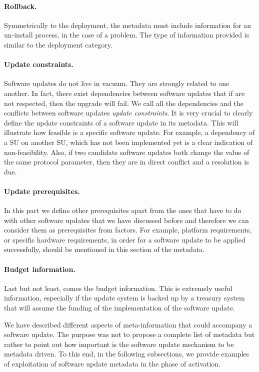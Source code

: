 \paragraph{Rollback.} Symmetrically to the deployment, the metadata must include information for an un-install process, in the case of a problem. The type of information provided is similar to the deployment category.
\paragraph{Update constraints.} Software updates do not live in vacuum. They are strongly related to one another. In fact, there exist dependencies between software updates that if are not respected, then the upgrade will fail. We call all the dependencies and the conflicts between software updates \emph{update constraints}. It is very crucial to clearly define the update constraints of a software update in its metadata. This will illustrate how feasible is a specific software update. For example, a dependency of a SU on another SU, which has not been implemented yet is a clear indication of non-feasibility. Also, if two candidate software updates both change the value of the same protocol parameter, then they are in direct conflict and a resolution is due.
\paragraph{Update prerequisites.} In this part we define other prerequisites apart from the ones that have to do with other software updates that we have discussed before and therefore we can consider them as prerequisites from  factors. For example, platform requirements, or specific hardware requirements, in order for a software update to be applied successfully, should be mentioned in this section of the metadata.
\paragraph{Budget information.} Last but not least, comes the budget information. This is extremely useful information, especially if the update system is backed up by a treasury system \cite{treasury} that will assume the funding of the implementation of the software update.

We have described different aspects of meta-information that could accompany a software update. The purpose was not to propose a complete list of metadata but rather to point out how important is the software update mechanism to be metadata driven. To this end, in the following subsections, we provide examples of exploitation of software update metadata in the phase of activation.


